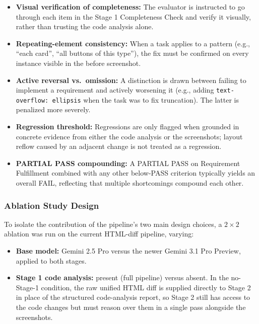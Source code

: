 \documentclass[sigconf,nonacm]{acmart}
\begin{document}
\begin{itemize}[noitemsep]
  \item \textbf{Visual verification of completeness:} The evaluator is instructed to go through each item in the Stage 1 Completeness Check and verify it visually, rather than trusting the code analysis alone.
  \item \textbf{Repeating-element consistency:} When a task applies to a pattern (e.g., ``each card'', ``all buttons of this type''), the fix must be confirmed on every instance visible in the before screenshot.
  \item \textbf{Active reversal vs.\ omission:} A distinction is drawn between failing to implement a requirement and actively worsening it (e.g., adding \texttt{text-overflow: ellipsis} when the task was to fix truncation). The latter is penalized more severely.
  \item \textbf{Regression threshold:} Regressions are only flagged when grounded in concrete evidence from either the code analysis or the screenshots; layout reflow caused by an adjacent change is not treated as a regression.
  \item \textbf{PARTIAL PASS compounding:} A PARTIAL PASS on Requirement Fulfillment combined with any other below-PASS criterion typically yields an overall FAIL, reflecting that multiple shortcomings compound each other.
\end{itemize}

\subsubsection{Ablation Study Design}

To isolate the contribution of the pipeline's two main design choices, a $2\times2$ ablation was run on the current HTML-diff pipeline, varying:

\begin{itemize}[noitemsep]
  \item \textbf{Base model:} Gemini 2.5 Pro versus the newer Gemini 3.1 Pro Preview, applied to both stages.
  \item \textbf{Stage 1 code analysis:} present (full pipeline) versus absent. In the no-Stage-1 condition, the raw unified HTML diff is supplied directly to Stage 2 in place of the structured code-analysis report, so Stage 2 still has access to the code changes but must reason over them in a single pass alongside the screenshots.
\end{itemize}
\end{document}
